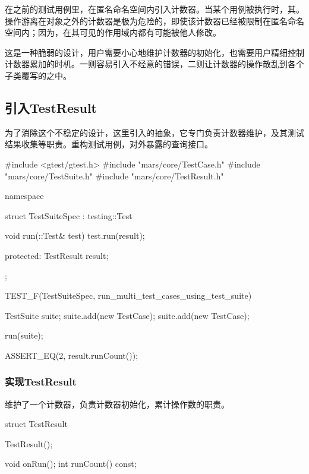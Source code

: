 \begin{content}

在之前的测试用例里，在匿名命名空间内引入计数器。当某个用例被执行时，其。操作游离在对象之外的计数器是极为危险的，即使该计数器已经被限制在匿名命名空间内；因为，在其可见的作用域内都有可能被他人修改。

这是一种脆弱的设计，用户需要小心地维护计数器的初始化，也需要用户精细控制计数器累加的时机。一则容易引入不经意的错误，二则让计数器的操作散乱到各个子类覆写的之中。

\subsection{引入TestResult}

为了消除这个不稳定的设计，这里引入的抽象，它专门负责计数器维护，及其测试结果收集等职责。重构测试用例，对外暴露的查询接口。

\begin{leftbar}
 \begin{c++}[caption={\ttfamily{test/mars/core/TestSuiteSpec.cc}}]
#include <gtest/gtest.h>
#include "mars/core/TestCase.h"
#include "mars/core/TestSuite.h"
#include "mars/core/TestResult.h"

namespace {
  struct TestSuiteSpec : testing::Test {
    void run(::Test& test) {
      test.run(result);
    }

  protected:
    TestResult result;
  };
}

TEST_F(TestSuiteSpec, run_multi_test_cases_using_test_suite) {
  TestSuite suite;
  suite.add(new TestCase);
  suite.add(new TestCase);

  run(suite);

  ASSERT_EQ(2, result.runCount());
}
 \end{c++}
\end{leftbar}

\subsubsection{实现TestResult}

维护了一个计数器，负责计数器初始化，累计操作数的职责。

\begin{leftbar}
 \begin{c++}[caption={\ttfamily{include/mars/core/TestResult.h}}]
struct TestResult {
  TestResult();

  void onRun();
  int runCount() const;

}
\end{c++}
\end{leftbar}
\end{content}
